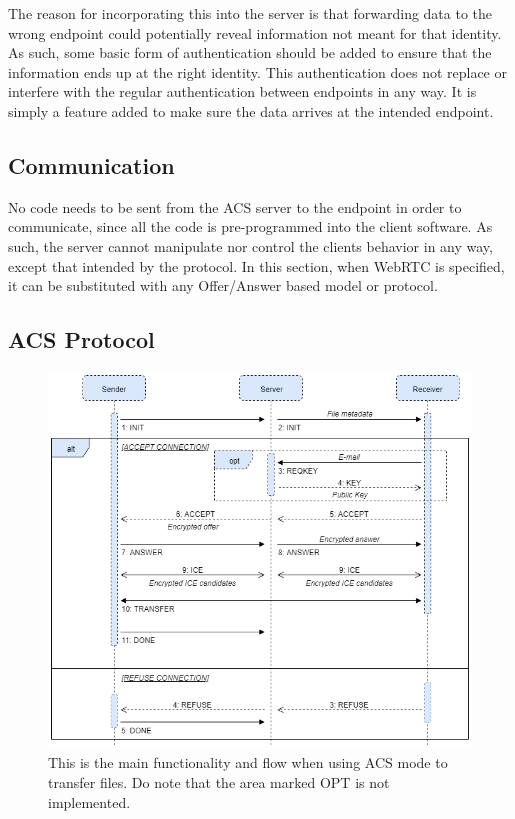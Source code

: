 		The reason for incorporating this into the server is that forwarding data to the wrong endpoint could potentially reveal information not meant for that identity. As such, some basic form of authentication should be added to ensure that the information ends up at the right identity. This authentication does not replace or interfere with the regular authentication between endpoints in any way. It is simply a feature added to make sure the data arrives at the intended endpoint.
	\subsection{Communication}
	No code needs to be sent from the ACS server to the endpoint in order to communicate, since all the code is pre-programmed into the client software. As such, the server cannot manipulate nor control the clients behavior in any way, except that intended by the protocol. In this section, when WebRTC is specified, it can be substituted with any Offer/Answer based model or protocol.

	\subsection{ACS Protocol}
	\label{sec:wsprot}
	\begin{figure}[th]
	  \centering
	  \includegraphics[width=\textwidth]{Figures/ACS_Prot/Communication}
	  \decoRule
	  \caption[ACS protocol: Communication]{This is the main functionality and flow when using ACS mode to transfer files. Do note that the area marked OPT is not implemented.}
	  \label{fig:prot_comm}
	\end{figure}

